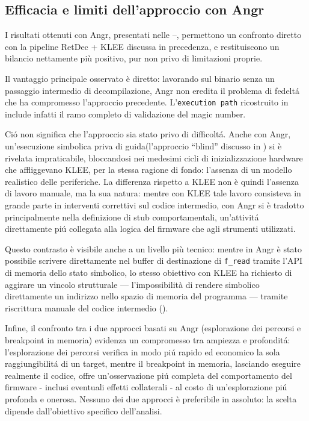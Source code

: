         \subsection{Efficacia e limiti dell'approccio con Angr}
        \label{subsec:efficacia_angr}
            I risultati ottenuti con Angr, presentati nelle --, 
            permettono un confronto diretto con la pipeline RetDec + KLEE discussa in precedenza, e restituiscono un bilancio nettamente più positivo, pur non privo di limitazioni proprie.
    
            Il vantaggio principale osservato è diretto: lavorando sul binario senza un passaggio intermedio di decompilazione, Angr non eredita il problema di fedeltá che ha compromesso l'approccio precedente.
            L'\texttt{execution path} ricostruito in  include infatti il ramo completo di validazione del magic number. 
    
            Ció non significa che l'approccio sia stato privo di difficoltá. Anche con Angr, un'esecuzione simbolica priva di guida(l'approccio ``blind'' discusso in ) si è rivelata impraticabile, bloccandosi nei medesimi cicli di inizializzazione hardware che affliggevano KLEE, per la stessa ragione di fondo: l'assenza di un modello realistico delle periferiche. La differenza rispetto a KLEE non è quindi l'assenza di lavoro manuale, ma la sua natura: mentre con KLEE tale lavoro consisteva in grande parte in interventi correttivi sul codice intermedio, con Angr si è tradotto principalmente nella definizione di stub comportamentali, un'attivitá direttamente piú collegata alla logica del firmware che agli strumenti utilizzati.
    
            Questo contrasto è visibile anche a un livello più tecnico: mentre in 
            Angr è stato possibile scrivere direttamente nel buffer di destinazione 
            di \texttt{f\_read} tramite l'API di memoria dello stato simbolico, 
            lo stesso obiettivo con KLEE ha richiesto di aggirare 
            un vincolo strutturale — l'impossibilità di rendere simbolico 
            direttamente un indirizzo nello spazio di memoria del programma — 
            tramite riscrittura manuale del codice intermedio ().
    
            Infine, il confronto tra i due approcci basati su Angr (esplorazione dei percorsi e breakpoint in memoria) evidenza un compromesso tra ampiezza e profonditá: l'esplorazione dei percorsi verifica in modo piú rapido ed economico la sola raggiungibilitá di un target, mentre il breakpoint in memoria, lasciando eseguire realmente il codice, offre un'osservazione piú completa del comportamento del firmware - inclusi eventuali effetti collaterali - al costo di un'esplorazione piú profonda e onerosa. Nessuno dei due approcci è preferibile in assoluto: la scelta dipende dall'obiettivo specifico dell'analisi.

